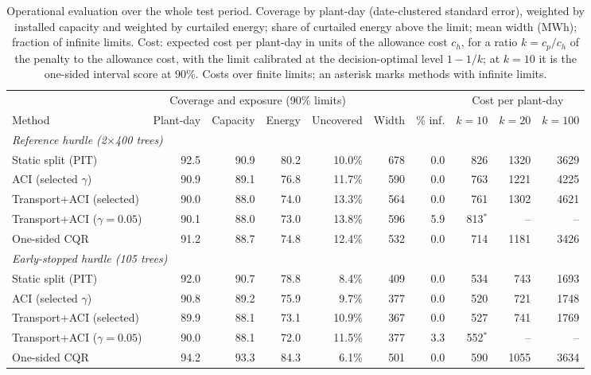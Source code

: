 \begin{table}[tp]
\centering
\footnotesize
\caption{Operational evaluation over the whole test period. Coverage by plant-day (date-clustered standard error), weighted by installed capacity and weighted by curtailed energy; share of curtailed energy above the limit; mean width (MWh); fraction of infinite limits. Cost: expected cost per plant-day in units of the allowance cost $c_h$, for a ratio $k=c_p/c_h$ of the penalty to the allowance cost, with the limit calibrated at the decision-optimal level $1-1/k$; at $k=10$ it is the one-sided interval score at 90\%. Costs over finite limits; an asterisk marks methods with infinite limits.}
\label{tab:operacional}
\setlength{\tabcolsep}{3.5pt}
\begin{tabular}{l rrrr rr rrr}
\toprule
 & \multicolumn{4}{c}{Coverage and exposure (90\% limits)} & & & \multicolumn{3}{c}{Cost per plant-day} \\
\cmidrule(lr){2-5}\cmidrule(lr){8-10}
Method & Plant-day & Capacity & Energy & Uncovered & Width & \% inf. & $k=10$ & $k=20$ & $k=100$ \\
\midrule
\multicolumn{10}{l}{\textit{Reference hurdle (2$\times$400 trees)}} \\
\quad Static split (PIT) & 92.5 & 90.9 & 80.2 & 10.0\% & 678 & 0.0 & 826 & 1320 & 3629 \\
\quad ACI (selected $\gamma$) & 90.9 & 89.1 & 76.8 & 11.7\% & 590 & 0.0 & 763 & 1221 & 4225 \\
\quad Transport+ACI (selected) & 90.0 & 88.0 & 74.0 & 13.3\% & 564 & 0.0 & 761 & 1302 & 4621 \\
\quad Transport+ACI ($\gamma=0.05$) & 90.1 & 88.0 & 73.0 & 13.8\% & 596 & 5.9 & 813$^\ast$ & -- & -- \\
\quad One-sided CQR & 91.2 & 88.7 & 74.8 & 12.4\% & 532 & 0.0 & 714 & 1181 & 3426 \\
\multicolumn{10}{l}{\textit{Early-stopped hurdle (105 trees)}} \\
\quad Static split (PIT) & 92.0 & 90.7 & 78.8 & 8.4\% & 409 & 0.0 & 534 & 743 & 1693 \\
\quad ACI (selected $\gamma$) & 90.8 & 89.2 & 75.9 & 9.7\% & 377 & 0.0 & 520 & 721 & 1748 \\
\quad Transport+ACI (selected) & 89.9 & 88.1 & 73.1 & 10.9\% & 367 & 0.0 & 527 & 741 & 1769 \\
\quad Transport+ACI ($\gamma=0.05$) & 90.0 & 88.1 & 72.0 & 11.5\% & 377 & 3.3 & 552$^\ast$ & -- & -- \\
\quad One-sided CQR & 94.2 & 93.3 & 84.3 & 6.1\% & 501 & 0.0 & 590 & 1055 & 3634 \\

\end{tabular}
\end{table}
